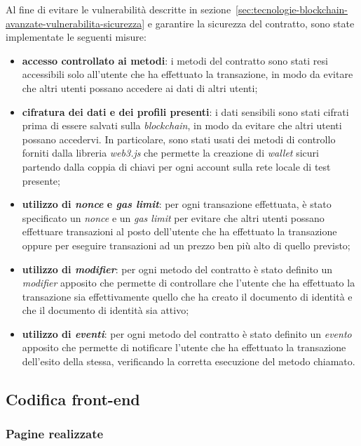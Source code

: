 Al fine di evitare le vulnerabilità descritte in sezione~\ref{sec:tecnologie-blockchain-avanzate-vulnerabilita-sicurezza} e garantire la sicurezza del contratto, sono state implementate le seguenti misure:
\begin{itemize}
    \item \textbf{accesso controllato ai metodi}: i metodi del contratto sono stati resi accessibili solo all'utente che ha effettuato la transazione, in modo da evitare che altri utenti possano accedere ai dati di altri utenti;
    \item \textbf{cifratura dei dati e dei profili presenti}: i dati sensibili sono stati cifrati prima di essere salvati sulla \textit{blockchain}, in modo da evitare che altri utenti possano accedervi. In particolare, sono stati usati dei metodi di controllo
    forniti dalla libreria \textit{web3.js} che permette la creazione di \textit{wallet} sicuri partendo dalla coppia di chiavi per ogni account sulla rete locale di test presente;
    \item \textbf{utilizzo di \textit{nonce} e \textit{gas limit}}: per ogni transazione effettuata, è stato specificato un \textit{nonce} e un \textit{gas limit} per evitare che altri utenti possano effettuare transazioni al posto dell'utente che ha effettuato la transazione oppure
    per eseguire transazioni ad un prezzo ben più alto di quello previsto;
    \item \textbf{utilizzo di \textit{modifier}}: per ogni metodo del contratto è stato definito un \textit{modifier} apposito che permette di controllare che l'utente che ha effettuato la transazione sia effettivamente quello che ha creato il documento di identità
    e che il documento di identità sia attivo;
    \item \textbf{utilizzo di \textit{eventi}}: per ogni metodo del contratto è stato definito un \textit{evento} apposito che permette di notificare l'utente che ha effettuato la transazione dell'esito della stessa, verificando la corretta esecuzione del metodo chiamato.
\end{itemize}

\subsection{Codifica front-end}\label{subsec:codice-front-end}

\subsubsection{Pagine realizzate}\label{subsubsec:pagine-realizzate}

